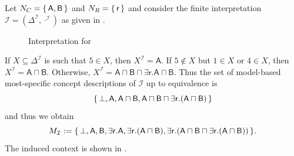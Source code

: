 \begin{Example}
  \label{expl:no-minimality}
  Let $N_C = {\{\, \mathsf{A}, \mathsf{B} \,\}}$ and $N_R = {\{\, \mathsf{r} \,\}}$ and consider
  the finite interpretation $\mathcal{I} = (\Delta^{\mathcal{I}}, \cdot^{\mathcal{I}})$ as
  given in .

  \begin{figure}[tp]
    \centering
    \caption{Interpretation for }
    \label{fig:no-minimality}
  \end{figure}

  If $X \subseteq \Delta^{\mathcal{I}}$ is such that $5 \in X$, then $X^{\mathcal{I}} =
  \mathsf{A}$.  If $5 \notin X$ but $1 \in X$ or $4 \in X$, then $X^{\mathcal{I}} =
  \mathsf{A} \sqcap \mathsf{B}$.  Otherwise, $X^{\mathcal{I}} = \mathsf{A \sqcap B \sqcap
    \exists r. A \sqcap B}$.  Thus the set of model-based most-specific concept
  descriptions of $\mathcal{I}$ up to equivalence is
  \begin{equation*}
    {\ensuremath{\{\, \bot, \mathsf{A}, \mathsf{A \sqcap B}, \mathsf{A \sqcap B \sqcap \exists
        r.(A \sqcap B)} \,\}}}
  \end{equation*}
  and thus we obtain
  \begin{equation*}
    M_{\mathcal{I}} := {\{\, \bot, \mathsf{A}, \mathsf{B}, \mathsf{\exists r. A},
      \mathsf{\exists r. (A \sqcap B)}, \mathsf{\exists r. (A \sqcap B \sqcap \exists
        r. (A \sqcap B))} \,\}}.
  \end{equation*}
  The induced context is shown in .


\end{Example}
